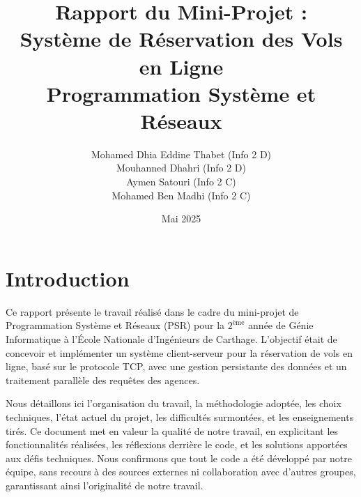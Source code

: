 \documentclass[a4paper,12pt]{article}
\title{\color{titleblue}Rapport du Mini-Projet : \\ Système de Réservation des Vols en Ligne \\ Programmation Système et Réseaux}
\author{
  \color{headergreen}Mohamed Dhia Eddine Thabet (Info 2 D) \\
  Mouhanned Dhahri (Info 2 D) \\
  Aymen Satouri (Info 2 C) \\
  Mohamed Ben Madhi (Info 2 C)
}
\date{\color{headergreen}Mai 2025}
\begin{document}
\maketitle

\tableofcontents
\newpage

\section{Introduction}
\begin{highlightbox}
Ce rapport présente le travail réalisé dans le cadre du mini-projet de Programmation Système et Réseaux (PSR) pour la $2^{\text{ème}}$ année de Génie Informatique à l'École Nationale d'Ingénieurs de Carthage. L'objectif était de concevoir et implémenter un système client-serveur pour la réservation de vols en ligne, basé sur le protocole TCP, avec une gestion persistante des données et un traitement parallèle des requêtes des agences.
\end{highlightbox}
Nous détaillons ici l'organisation du travail, la méthodologie adoptée, les choix techniques, l'état actuel du projet, les difficultés surmontées, et les enseignements tirés. Ce document met en valeur la qualité de notre travail, en explicitant les fonctionnalités réalisées, les réflexions derrière le code, et les solutions apportées aux défis techniques. Nous confirmons que tout le code a été développé par notre équipe, sans recours à des sources externes ni collaboration avec d'autres groupes, garantissant ainsi l'originalité de notre travail.
\end{document}
